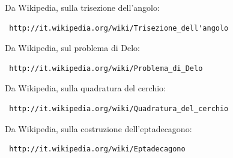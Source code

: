 \documentclass[a4paper,11pt,oneside]{report}
\begin{document}
\begin{thebibliography}{21}
Da Wikipedia, sulla trisezione dell'angolo: \begin{verbatim} http://it.wikipedia.org/wiki/Trisezione_dell'angolo \end{verbatim}

Da Wikipedia, sul problema di Delo: \begin{verbatim} http://it.wikipedia.org/wiki/Problema_di_Delo \end{verbatim}

Da Wikipedia, sulla quadratura del cerchio: \begin{verbatim} http://it.wikipedia.org/wiki/Quadratura_del_cerchio \end{verbatim}

Da Wikipedia, sulla costruzione dell'eptadecagono: \begin{verbatim} http://it.wikipedia.org/wiki/Eptadecagono \end{verbatim}

\end{thebibliography}
\end{document}
